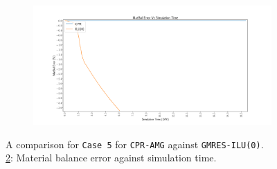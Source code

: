 \begin{figure}
\centering
\begin{subfigure}[b]{\textwidth}
   \includegraphics[width=1\linewidth]{figures/viscous/320x320/matbalerr_time.pdf}
   \caption{}
   \label{viscous320_matbalerr}
\end{subfigure}

\caption[caption]{A comparison for \texttt{Case 5} for \texttt{CPR-AMG} against \texttt{GMRES-ILU(0)}.\\\hspace{\textwidth}
	\cref{viscous320_matbalerr}: Material balance error against simulation time. \\\hspace{\textwidth}}
\end{figure}

